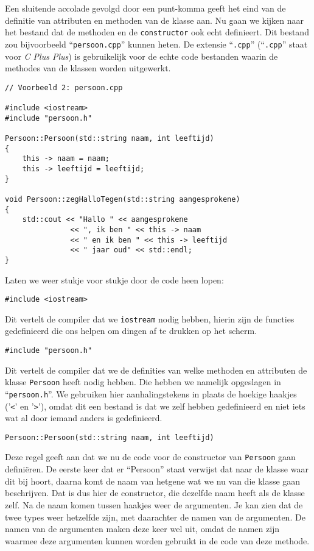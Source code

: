 \documentclass{article}
\begin{document}
Een sluitende accolade gevolgd door een punt-komma geeft het eind van de definitie van attributen en methoden van de klasse aan. Nu gaan we kijken naar het bestand dat de methoden en de \texttt{constructor} ook echt definieert. Dit bestand zou bijvoorbeeld “\texttt{persoon.cpp}” kunnen heten. De extensie “\texttt{.cpp}” (“\texttt{.cpp}” staat voor \emph{C Plus Plus}) is gebruikelijk voor de echte code bestanden waarin de methodes van de klassen worden uitgewerkt.

\begin{lstlisting}
// Voorbeeld 2: persoon.cpp

#include <iostream>
#include "persoon.h"

Persoon::Persoon(std::string naam, int leeftijd)
{
    this -> naam = naam;
    this -> leeftijd = leeftijd;
}

void Persoon::zegHalloTegen(std::string aangesprokene)
{
    std::cout << "Hallo " << aangesprokene
               << ", ik ben " << this -> naam
               << " en ik ben " << this -> leeftijd
               << " jaar oud" << std::endl;
}
\end{lstlisting}

Laten we weer stukje voor stukje door de code heen lopen:

\begin{lstlisting}[frame=none]
#include <iostream>
\end{lstlisting}

Dit vertelt de compiler dat we \texttt{iostream} nodig hebben, hierin zijn de functies gedefinieerd die
ons helpen om dingen af te drukken op het scherm.

\begin{lstlisting}[frame=none]
#include "persoon.h"
\end{lstlisting}

Dit vertelt de compiler dat we de definities van welke methoden en attributen de klasse \texttt{Persoon} heeft nodig hebben. Die hebben we namelijk opgeslagen in “\texttt{persoon.h}”. We gebruiken hier aanhalingstekens in plaats de hoekige haakjes ('\texttt{<}' en '\texttt{>}'), omdat dit een bestand is dat we zelf hebben gedefinieerd en niet iets wat al door iemand anders is gedefinieerd.

\begin{lstlisting}[frame=none]
Persoon::Persoon(std::string naam, int leeftijd)
\end{lstlisting}

Deze regel geeft aan dat we nu de code voor de constructor van \texttt{Persoon} gaan definiëren. De eerste keer dat er “Persoon” staat verwijst dat naar de klasse waar dit bij hoort, daarna komt de naam van hetgene wat we nu van die klasse gaan beschrijven. Dat is dus hier de constructor, die dezelfde naam heeft als de klasse zelf. Na de naam komen tussen haakjes weer de argumenten. Je kan zien dat de twee types weer hetzelfde zijn, met daarachter de namen van de argumenten. De namen van de argumenten maken deze keer wel uit, omdat de namen zijn waarmee deze argumenten kunnen worden gebruikt in de code van deze methode.
\end{document}
